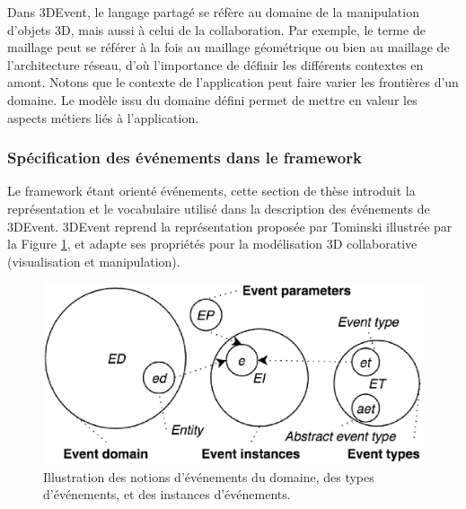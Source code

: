 Dans 3DEvent, le langage partagé se réfère au domaine de la manipulation 
d'objets \gls{3D}, mais aussi à celui de la collaboration. Par exemple, le terme 
de 
maillage peut se référer à la fois au maillage géométrique ou bien au maillage de 
l'architecture réseau, d'où l'importance de définir les différents contextes en amont. 
Notons que le contexte de l'application peut faire varier les frontières d'un 
domaine. Le modèle issu du domaine défini permet de mettre en valeur les 
aspects métiers liés à l'application.

\subsubsection{Spécification des événements dans le framework}
Le \gls{framework} étant orienté événements, cette section de thèse introduit la 
représentation et 
le vocabulaire utilisé dans la description des événements de 3DEvent. 3DEvent 
reprend la représentation proposée par Tominski \cite{Doktor-ingenieur2006} 
illustrée par la Figure \ref{fig:representation_event}, et adapte ses propriétés pour 
la modélisation \gls{3D} collaborative (visualisation et manipulation). 

\begin{figure}[ht]
	\centering
	\includegraphics[width=0.7\columnwidth]{eps/event4.eps}
	\caption{Illustration des notions d'événements du domaine, des types 
		d'événements, et des instances d'événements.}
	\label{fig:representation_event}
\end{figure} 

